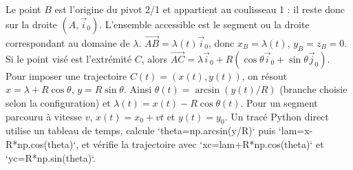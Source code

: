 \begin{corrigebox}
Le point $B$ est l'origine du pivot 2/1 et appartient au coulisseau 1 : il reste donc sur la droite $(A,\vec i_0)$. L'ensemble accessible est le segment ou la droite correspondant au domaine de $\lambda$.
$\overrightarrow{AB}=\lambda(t)\vec i_0$, donc $x_B=\lambda(t)$, $y_B=z_B=0$. Si le point visé est l'extrémité $C$, alors $\overrightarrow{AC}=\lambda\vec i_0+R(\cos\theta\vec i_0+\sin\theta\vec j_0)$.
Pour imposer une trajectoire $C(t)=(x(t),y(t))$, on résout
                $x=\lambda+R\cos\theta$, $y=R\sin\theta$. Ainsi
                $\theta(t)=\arcsin(y(t)/R)$ (branche choisie selon la configuration) et
                $\lambda(t)=x(t)-R\cos\theta(t)$. Pour un segment parcouru à vitesse $v$,
                $x(t)=x_0+vt$ et $y(t)=y_0$.
Un tracé Python direct utilise un tableau de temps, calcule
                `theta=np.arcsin(y/R)` puis `lam=x-R*np.cos(theta)`, et vérifie la
                trajectoire avec `xc=lam+R*np.cos(theta)` et `yc=R*np.sin(theta)`.
\end{corrigebox}
